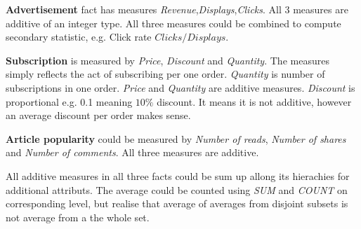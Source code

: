 
{\bf Advertisement} fact has measures {\it Revenue},{\it Displays},{\it Clicks}. All 3 measures are additive of an integer type. All three measures could be combined to compute secondary statistic, e.g. Click rate $Clicks / Displays$. 

{\bf Subscription} is measured by {\it Price}, {\it Discount} and {\it Quantity}. The measures simply reflects the act of subscribing per one order. {\it Quantity} is number of subscriptions in one order. {\it Price} and {\it Quantity} are additive measures. {\it Discount} is proportional e.g. 0.1 meaning $10\%$ discount. It means it is not additive, however an average discount per order makes sense.

{\bf Article popularity} could be measured by {\it Number of reads}, {\it Number of shares} and {\it Number of comments}.
All three measures are additive.

All additive measures in all three facts could be sum up allong its hierachies for additional attributs. The average could be counted using {\it SUM} and {\it COUNT} on corresponding level, but realise that average of averages from disjoint subsets is not average from a the whole set.
